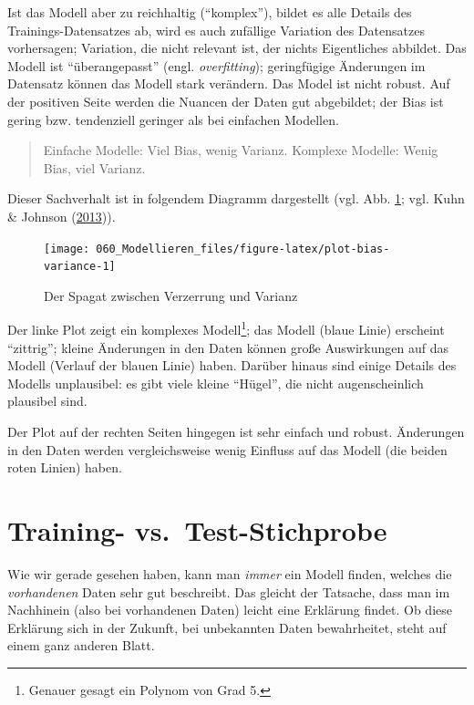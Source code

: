 \documentclass[12pt,ngerman,]{book}
\let\rmarkdownfootnote\footnote%
\def\footnote{\protect\rmarkdownfootnote}
\theoremstyle{definition}
\theoremstyle{definition}
\theoremstyle{remark}
\begin{document}
Ist das Modell aber zu reichhaltig (``komplex''), bildet es alle Details
des Trainings-Datensatzes ab, wird es auch zufällige Variation des
Datensatzes vorhersagen; Variation, die nicht relevant ist, der nichts
Eigentliches abbildet. Das Modell ist ``überangepasst'' (engl.
\emph{overfitting}); geringfügige Änderungen im Datensatz können das
Modell stark verändern. Das Model ist nicht robust. Auf der positiven
Seite werden die Nuancen der Daten gut abgebildet; der Bias ist gering
bzw. tendenziell geringer als bei einfachen Modellen.

\begin{quote}
Einfache Modelle: Viel Bias, wenig Varianz. Komplexe Modelle: Wenig
Bias, viel Varianz.
\end{quote}

Dieser Sachverhalt ist in folgendem Diagramm dargestellt (vgl. Abb.
\ref{fig:plot-bias-variance}; vgl. Kuhn \& Johnson
(\protect\hyperlink{ref-kuhn2013applied}{2013})).

\begin{figure}

{\centering \texttt{[image: 060\_Modellieren\_files/figure-latex/plot-bias-variance-1]} 

}

\caption{Der Spagat zwischen Verzerrung und Varianz}\label{fig:plot-bias-variance}
\end{figure}

Der linke Plot zeigt ein komplexes Modell\footnote{Genauer gesagt ein
  Polynom von Grad 5.}; das Modell (blaue Linie) erscheint ``zittrig'';
kleine Änderungen in den Daten können große Auswirkungen auf das Modell
(Verlauf der blauen Linie) haben. Darüber hinaus sind einige Details des
Modells unplausibel: es gibt viele kleine ``Hügel'', die nicht
augenscheinlich plausibel sind.

Der Plot auf der rechten Seiten hingegen ist sehr einfach und robust.
Änderungen in den Daten werden vergleichsweise wenig Einfluss auf das
Modell (die beiden roten Linien) haben.

\section{Training-
vs.~Test-Stichprobe}\label{training--vs.test-stichprobe}

Wie wir gerade gesehen haben, kann man \emph{immer} ein Modell finden,
welches die \emph{vorhandenen} Daten sehr gut beschreibt. Das gleicht
der Tatsache, dass man im Nachhinein (also bei vorhandenen Daten) leicht
eine Erklärung findet. Ob diese Erklärung sich in der Zukunft, bei
unbekannten Daten bewahrheitet, steht auf einem ganz anderen Blatt.
\end{document}
